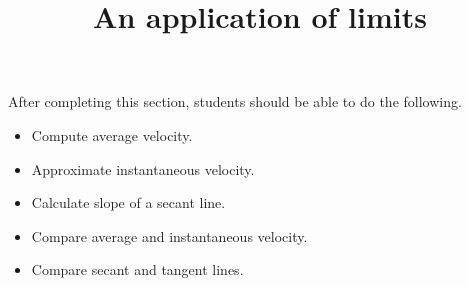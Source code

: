 \documentclass{ximera}
\title{An application of limits}
\begin{document}
\begin{abstract}
\end{abstract}

\maketitle

\begin{sectionOutcomes}

After completing this section, students should be able to do the following.

\begin{itemize}
	\item Compute average velocity.
	\item Approximate instantaneous velocity.
	\item Calculate slope of a secant line.
	\item Compare average and instantaneous velocity.
	\item Compare secant and tangent lines.
\end{itemize}

\end{sectionOutcomes}
\end{document}
